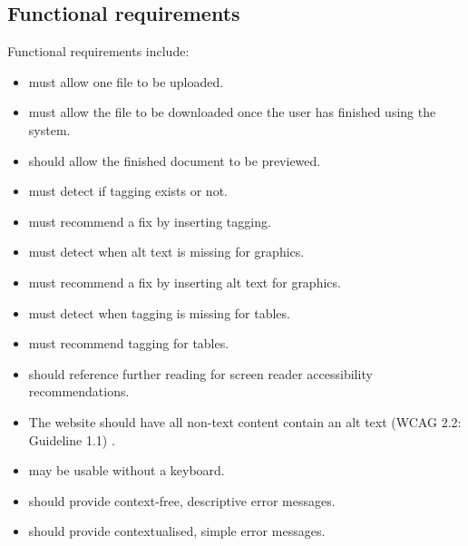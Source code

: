 \subsection{Functional requirements}\label{appendix:func_requirements}
Functional requirements include:
\begin{itemize}
    \item \lintexspaced must allow one \latexspaced file to be uploaded.
    \item \lintexspaced must allow the file to be downloaded once the user has finished using the system.
    \item \lintexspaced should allow the finished document to be previewed.
    \item \lintexspaced must detect if tagging exists or not.
    \item \lintexspaced must recommend a fix by inserting tagging.
    \item \lintexspaced must detect when alt text is missing for graphics.
    \item \lintexspaced must recommend a fix by inserting alt text for graphics.
    \item \lintexspaced must detect when tagging is missing for tables.
    \item \lintexspaced must recommend tagging for tables.
    \item \lintexspaced should reference further reading for screen reader accessibility recommendations.
    \item The website should have all non-text content contain an alt text (WCAG 2.2: Guideline 1.1) \cite{wcag}.
    \item \lintexspaced may be usable without a keyboard.
    \item \lintexspaced should provide context-free, descriptive error messages.
    \item \lintexspaced should provide contextualised, simple error messages.
\end{itemize}
\clearpage

